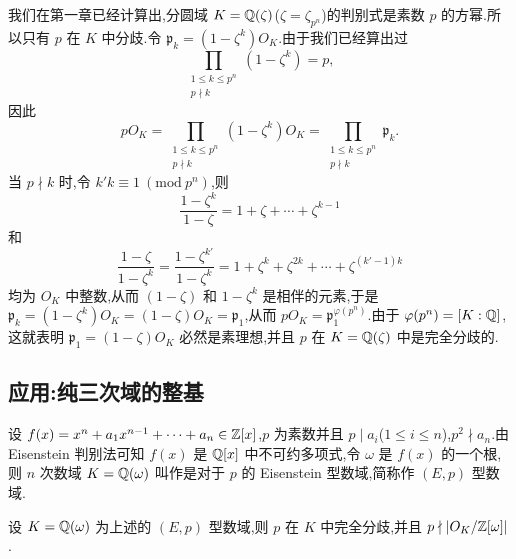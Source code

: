 \begin{example}\label{ex:ch2-s2-4-2}
我们在第一章已经计算出,分圆域 $K=\mathbb{Q}(\zeta)$($\zeta=\zeta_{p^n}$)的判别式是素数 $p$ 的方幂.所以只有 $p$ 在 $K$ 中分歧.令 $\mathfrak{p}_k=(1-\zeta^k)O_K$.由于我们已经算出过
\[
  \prod_{\substack{1\leqslant k\leqslant p^n\\ p\nmid k}}(1-\zeta^k)=p,
\]
因此
\[
  pO_K=\prod_{\substack{1\leqslant k\leqslant p^n\\ p\nmid k}}(1-\zeta^k)O_K=\prod_{\substack{1\leqslant k\leqslant p^n\\ p\nmid k}}\mathfrak{p}_k.
\]
当 $p\nmid k$ 时,令 $k'k\equiv 1\ (\mathrm{mod}\ p^n)$,则
\[
  \frac{1-\zeta^k}{1-\zeta}=1+\zeta+\cdots+\zeta^{k-1}
\]
和
\[
  \frac{1-\zeta}{1-\zeta^k}=\frac{1-\zeta^{k'}}{1-\zeta^k}=1+\zeta^k+\zeta^{2k}+\cdots+\zeta^{(k'-1)k}
\]
均为 $O_K$ 中整数,从而 $(1-\zeta)$ 和 $1-\zeta^k$ 是相伴的元素,于是 $\mathfrak{p}_k=(1-\zeta^k)O_K=(1-\zeta)O_K=\mathfrak{p}_1$,从而 $pO_K=\mathfrak{p}_1^{\varphi(p^n)}$.由于 $\varphi(p^n)=[K:\mathbb{Q}]$,这就表明 $\mathfrak{p}_1=(1-\zeta)O_K$ 必然是素理想,并且 $p$ 在 $K=\mathbb{Q}(\zeta)$ 中是完全分歧的.
\end{example}

\subsection{应用:纯三次域的整基}\label{sec:ch2-s2-5}

设 $f(x)=x^n+a_1x^{n-1}+\cdots+a_n\in\mathbb{Z}[x]$,$p$ 为素数并且 $p\mid a_i$($1\leqslant i\leqslant n$),$p^2\nmid a_n$.由 Eisenstein 判别法可知 $f(x)$ 是 $\mathbb{Q}[x]$ 中不可约多项式,令 $\omega$ 是 $f(x)$ 的一个根,则 $n$ 次数域 $K=\mathbb{Q}(\omega)$ 叫作是对于 $p$ 的 Eisenstein 型数域,简称作 $(E,p)$ 型数域.

\begin{lemma}\label{lem:ch2-14}
设 $K=\mathbb{Q}(\omega)$ 为上述的 $(E,p)$ 型数域,则 $p$ 在 $K$ 中完全分歧,并且 $p\nmid|O_K/\mathbb{Z}[\omega]|$.
\end{lemma}

